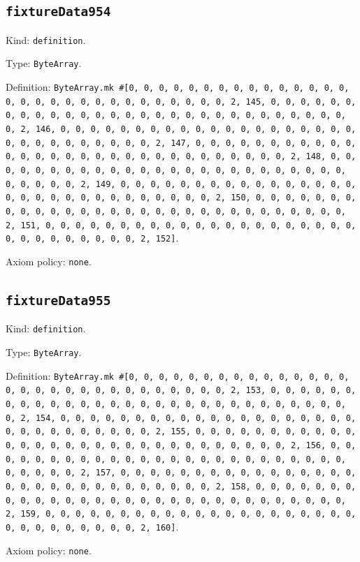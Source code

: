 \documentclass[11pt]{article}
\begin{document}
\subsection*{\texttt{fixtureData954}}
\noindent Kind: \texttt{definition}.\par
\noindent Type: \texttt{ByteArray}.\par
\noindent Definition: \texttt{ByteArray.mk \#[0, 0, 0, 0, 0, 0, 0, 0, 0, 0, 0, 0, 0, 0, 0, 0, 0, 0, 0, 0, 0, 0, 0, 0, 0, 0, 0, 0, 0, 0, 2, 145, 0, 0, 0, 0, 0, 0, 0, 0, 0, 0, 0, 0, 0, 0, 0, 0, 0, 0, 0, 0, 0, 0, 0, 0, 0, 0, 0, 0, 0, 0, 2, 146, 0, 0, 0, 0, 0, 0, 0, 0, 0, 0, 0, 0, 0, 0, 0, 0, 0, 0, 0, 0, 0, 0, 0, 0, 0, 0, 0, 0, 0, 0, 2, 147, 0, 0, 0, 0, 0, 0, 0, 0, 0, 0, 0, 0, 0, 0, 0, 0, 0, 0, 0, 0, 0, 0, 0, 0, 0, 0, 0, 0, 0, 0, 2, 148, 0, 0, 0, 0, 0, 0, 0, 0, 0, 0, 0, 0, 0, 0, 0, 0, 0, 0, 0, 0, 0, 0, 0, 0, 0, 0, 0, 0, 0, 0, 2, 149, 0, 0, 0, 0, 0, 0, 0, 0, 0, 0, 0, 0, 0, 0, 0, 0, 0, 0, 0, 0, 0, 0, 0, 0, 0, 0, 0, 0, 0, 0, 2, 150, 0, 0, 0, 0, 0, 0, 0, 0, 0, 0, 0, 0, 0, 0, 0, 0, 0, 0, 0, 0, 0, 0, 0, 0, 0, 0, 0, 0, 0, 0, 2, 151, 0, 0, 0, 0, 0, 0, 0, 0, 0, 0, 0, 0, 0, 0, 0, 0, 0, 0, 0, 0, 0, 0, 0, 0, 0, 0, 0, 0, 0, 0, 2, 152]}.\par
\noindent Axiom policy: \texttt{none}.\par
\subsection*{\texttt{fixtureData955}}
\noindent Kind: \texttt{definition}.\par
\noindent Type: \texttt{ByteArray}.\par
\noindent Definition: \texttt{ByteArray.mk \#[0, 0, 0, 0, 0, 0, 0, 0, 0, 0, 0, 0, 0, 0, 0, 0, 0, 0, 0, 0, 0, 0, 0, 0, 0, 0, 0, 0, 0, 0, 2, 153, 0, 0, 0, 0, 0, 0, 0, 0, 0, 0, 0, 0, 0, 0, 0, 0, 0, 0, 0, 0, 0, 0, 0, 0, 0, 0, 0, 0, 0, 0, 2, 154, 0, 0, 0, 0, 0, 0, 0, 0, 0, 0, 0, 0, 0, 0, 0, 0, 0, 0, 0, 0, 0, 0, 0, 0, 0, 0, 0, 0, 0, 0, 2, 155, 0, 0, 0, 0, 0, 0, 0, 0, 0, 0, 0, 0, 0, 0, 0, 0, 0, 0, 0, 0, 0, 0, 0, 0, 0, 0, 0, 0, 0, 0, 2, 156, 0, 0, 0, 0, 0, 0, 0, 0, 0, 0, 0, 0, 0, 0, 0, 0, 0, 0, 0, 0, 0, 0, 0, 0, 0, 0, 0, 0, 0, 0, 2, 157, 0, 0, 0, 0, 0, 0, 0, 0, 0, 0, 0, 0, 0, 0, 0, 0, 0, 0, 0, 0, 0, 0, 0, 0, 0, 0, 0, 0, 0, 0, 2, 158, 0, 0, 0, 0, 0, 0, 0, 0, 0, 0, 0, 0, 0, 0, 0, 0, 0, 0, 0, 0, 0, 0, 0, 0, 0, 0, 0, 0, 0, 0, 2, 159, 0, 0, 0, 0, 0, 0, 0, 0, 0, 0, 0, 0, 0, 0, 0, 0, 0, 0, 0, 0, 0, 0, 0, 0, 0, 0, 0, 0, 0, 0, 2, 160]}.\par
\noindent Axiom policy: \texttt{none}.\par
\end{document}
